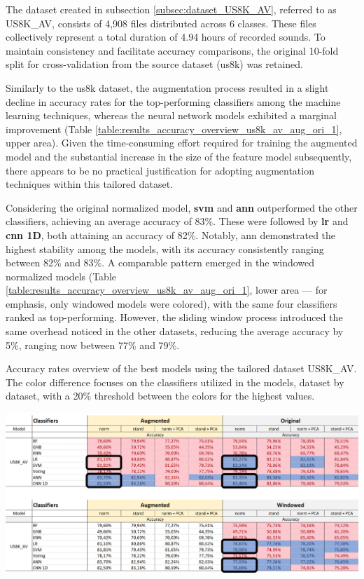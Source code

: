 
The dataset created in subsection \ref{subsec:dataset_US8K_AV}, referred to as US8K\_AV, consists of 4,908 files distributed across 6 classes. These files collectively represent a total duration of 4.94 hours of recorded sounds. To maintain consistency and facilitate accuracy comparisons, the original 10-fold split for cross-validation from the source dataset (\gls{us8k}) was retained.

Similarly to the \gls{us8k} dataset, the augmentation process resulted in a slight decline in accuracy rates for the top-performing classifiers among the machine learning techniques, whereas the neural network models exhibited a marginal improvement (Table \ref{table:results_accuracy_overview_us8k_av_aug_ori_1}, upper area). Given the time-consuming effort required for training the augmented model and the substantial increase in the size of the feature model subsequently, there appears to be no practical justification for adopting augmentation techniques within this tailored dataset.

Considering the original normalized model, \textbf{\gls{svm}} and \textbf{\gls{ann}} outperformed the other classifiers, achieving an average accuracy of 83\%. These were followed by \textbf{\gls{lr}} and \textbf{\gls{cnn} 1D}, both attaining an accuracy of 82\%. Notably, \gls{ann} demonstrated the highest stability among the models, with its accuracy consistently ranging between 82\% and 83\%. A comparable pattern emerged in the windowed normalized models (Table \ref{table:results_accuracy_overview_us8k_av_aug_ori_1}, lower area — for emphasis, only windowed models were colored), with the same four classifiers ranked as top-performing. However, the sliding window process introduced the same overhead noticed in the other datasets, reducing the average accuracy by 5\%, ranging now between 77\% and 79\%.

\begin{table}[ht!]
    \caption[Accuracy rates overview using the tailored dataset US8K\_AV.]{Accuracy rates overview of the best models using the tailored dataset US8K\_AV. The color difference focuses on the classifiers utilized in the models, dataset by dataset, with a 20\% threshold between the colors for the highest values.}
    \label{table:results_accuracy_overview_us8k_av_aug_ori_1}
     \raggedright
    \includegraphics[width=1\textwidth]{resources/images/060-results/Results_classification_overview_us8k_av_aug_x_ori_1.png}
\end{table}

